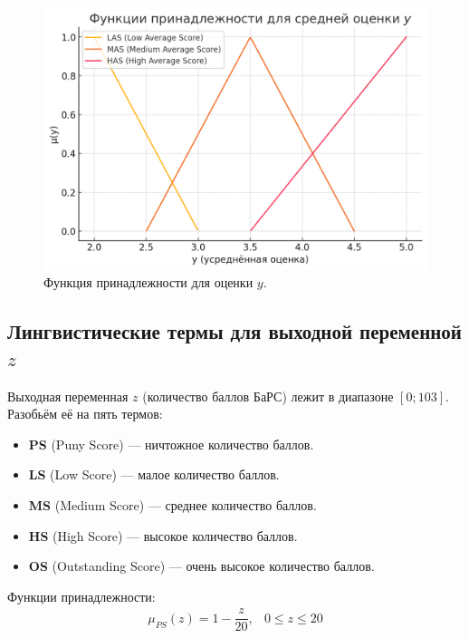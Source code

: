 \documentclass{article}
\begin{document}
\begin{figure}[h!]
    \centering
    \includegraphics[width=0.8\linewidth]{membership_y.png}
    \caption{Функция принадлежности для оценки $y$.}
    \label{fig:membership_y}
\end{figure}

\newpage
\subsection{Лингвистические термы для выходной переменной $z$}

Выходная переменная $z$ (количество баллов БаРС) лежит в диапазоне $[0;103]$. Разобьём её на пять термов:
\begin{itemize}
    \item \textbf{PS} (Puny Score) — ничтожное количество баллов.
    \item \textbf{LS} (Low Score) — малое количество баллов.
    \item \textbf{MS} (Medium Score) — среднее количество баллов.
    \item \textbf{HS} (High Score) — высокое количество баллов.
    \item \textbf{OS} (Outstanding Score) — очень высокое количество баллов.
\end{itemize}

Функции принадлежности:
\begin{align*}
    \mu_{PS}(z) = 1 - \dfrac{z}{20}, & 0 \le z \le 20
\end{align*}
\end{document}

